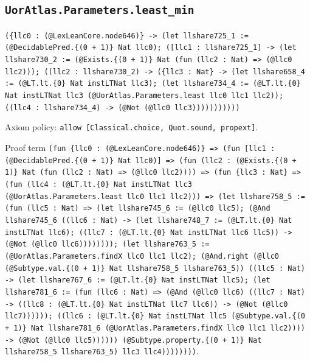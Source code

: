 \documentclass[11pt]{article}
\begin{document}
\subsection*{\texttt{UorAtlas.Parameters.least\_min}}
\noindent\texttt{(\{llc0 : (@LexLeanCore.node646)\} -> (let llshare725\_1 := (@DecidablePred.\{(0 + 1)\} Nat llc0); ([llc1 : llshare725\_1] -> (let llshare730\_2 := (@Exists.\{(0 + 1)\} Nat (fun (llc2 : Nat) => (@llc0 llc2))); ((llc2 : llshare730\_2) -> (\{llc3 : Nat\} -> (let llshare658\_4 := (@LT.lt.\{0\} Nat instLTNat llc3); (let llshare734\_4 := (@LT.lt.\{0\} Nat instLTNat llc3 (@UorAtlas.Parameters.least llc0 llc1 llc2)); ((llc4 : llshare734\_4) -> (@Not (@llc0 llc3)))))))))))}\par
\noindent Axiom policy: \texttt{allow [Classical.choice, Quot.sound, propext]}.\par
\noindent Proof term \texttt{(fun \{llc0 : (@LexLeanCore.node646)\} => (fun [llc1 : (@DecidablePred.\{(0 + 1)\} Nat llc0)] => (fun (llc2 : (@Exists.\{(0 + 1)\} Nat (fun (llc2 : Nat) => (@llc0 llc2)))) => (fun \{llc3 : Nat\} => (fun (llc4 : (@LT.lt.\{0\} Nat instLTNat llc3 (@UorAtlas.Parameters.least llc0 llc1 llc2))) => (let llshare758\_5 := (fun (llc5 : Nat) => (let llshare745\_6 := (@llc0 llc5); (@And llshare745\_6 ((llc6 : Nat) -> (let llshare748\_7 := (@LT.lt.\{0\} Nat instLTNat llc6); ((llc7 : (@LT.lt.\{0\} Nat instLTNat llc6 llc5)) -> (@Not (@llc0 llc6)))))))); (let llshare763\_5 := (@UorAtlas.Parameters.findX llc0 llc1 llc2); (@And.right (@llc0 (@Subtype.val.\{(0 + 1)\} Nat llshare758\_5 llshare763\_5)) ((llc5 : Nat) -> (let llshare767\_6 := (@LT.lt.\{0\} Nat instLTNat llc5); (let llshare781\_6 := (fun (llc6 : Nat) => (@And (@llc0 llc6) ((llc7 : Nat) -> ((llc8 : (@LT.lt.\{0\} Nat instLTNat llc7 llc6)) -> (@Not (@llc0 llc7)))))); ((llc6 : (@LT.lt.\{0\} Nat instLTNat llc5 (@Subtype.val.\{(0 + 1)\} Nat llshare781\_6 (@UorAtlas.Parameters.findX llc0 llc1 llc2)))) -> (@Not (@llc0 llc5)))))) (@Subtype.property.\{(0 + 1)\} Nat llshare758\_5 llshare763\_5) llc3 llc4))))))))}.\par
\end{document}
